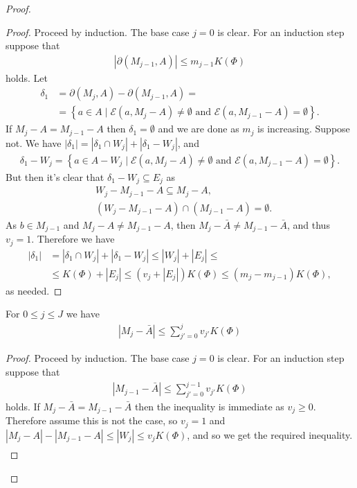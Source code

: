 \documentclass{amsart}
\newcommand{\BA}{\bar A}
\newcommand{\E}{\mathscr E}
\newcommand{\curly}[1]{\left\{#1\right\}}
\begin{document}
\begin{proof}
  \begin{proof} %
    Proceed by induction. The base case $j = 0$ is clear.
    For an induction step suppose that
    \begin{align*}
      |\partial(M_{j-1}, A)| \leq m_{j-1}  K(\Phi)
    \end{align*}
    holds.
    Let
    \begin{align*}
      \delta_1 &= \partial(M_j, A) - \partial(M_{j-1}, A) = \\
               &=\curly{a \in A \mid  \E(a, M_j - A) \neq \emptyset \text{ and } \E(a, M_{j-1} - A) = \emptyset}.
    \end{align*}
    If $M_j - A = M_{j-1} - A$ then $\delta_1 = \emptyset$ and we are done as $m_j$ is increasing.
    Suppose not.
    We have $|\delta_1| = |\delta_1 \cap W_j| + |\delta_1 - W_j|$, and
    \begin{align*}
      \delta_1 - W_j = \curly{a \in A - W_j \mid \E(a, M_j - A) \neq \emptyset \text{ and } \E(a, M_{j-1} - A) = \emptyset}.
    \end{align*}
    But then it's clear that $\delta_1 - W_j \subseteq E_j$ as
    \begin{align*}
      &W_j - M_{j-1} - A \subseteq M_j - A, \\
      &(W_j - M_{j-1} - A) \cap (M_{j-1} - A) = \emptyset.
    \end{align*}
    As $b \in M_{j-1}$ and $M_j - A \neq M_{j-1} - A$, then $M_j - \BA \neq M_{j-1} - \BA$, and thus $v_j = 1$. 
    Therefore we have
    \begin{align*}
      |\delta_1| &= |\delta_1 \cap W_j| + |\delta_1 - W_j| \leq |W_j| + |E_j| \leq \\
      &\leq K(\Phi) + |E_j|
      \leq (v_j + |E_j|) K(\Phi)  \leq (m_j - m_{j-1}) K(\Phi),
    \end{align*}
    as needed.
  \end{proof}

  \begin{Lemma} \label{ub_lemma}
    For $0 \leq j \leq J$ we have
    \begin{align*}
      |M_j - \BA| \leq \sum_{j'=0}^j v_{j'} K(\Phi)
    \end{align*}
  \end{Lemma}

  \begin{proof} %
    Proceed by induction. The base case $j = 0$ is clear.
    For an induction step suppose that
    \begin{align*}
      |M_{j-1} - \BA| \leq \sum_{j'=0}^{j-1} v_{j'} K(\Phi)
    \end{align*}
    holds.
    If $M_j - \BA = M_{j-1} - \BA$ then the inequality is immediate as $v_j \geq 0$.
    Therefore assume this is not the case, so $v_j = 1$ and $|M_j - A| - |M_{j-1} - A| \leq |W_j| \leq v_j K(\Phi)$, and so we get the required inequality.
    \begin{align*}
    \end{align*}
  \end{proof}
  

\end{proof}
\end{document}

